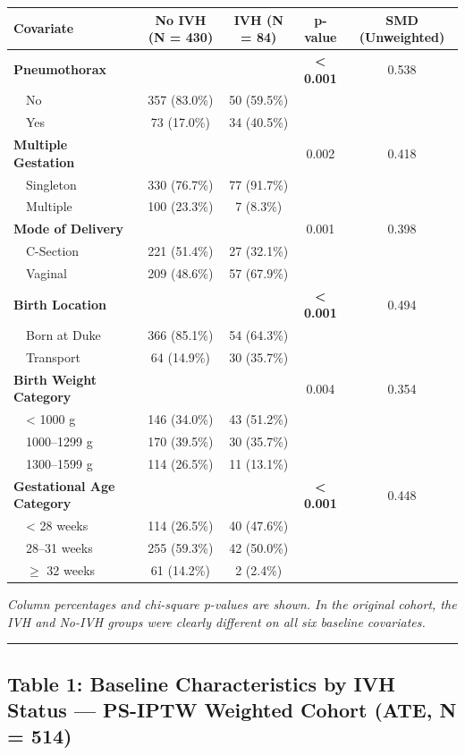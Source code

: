 \documentclass[
]{article}
\begin{document}
\begin{longtable}[]{@{}lcccc@{}}
\toprule
Covariate & No IVH (N = 430) & IVH (N = 84) & p-value & SMD
(Unweighted) \\
\midrule
\endhead
\textbf{Pneumothorax} & & & \textbf{\textless{} 0.001} & 0.538 \\
 No & 357 (83.0\%) & 50 (59.5\%) & & \\
 Yes & 73 (17.0\%) & 34 (40.5\%) & & \\
\textbf{Multiple Gestation} & & & 0.002 & 0.418 \\
 Singleton & 330 (76.7\%) & 77 (91.7\%) & & \\
 Multiple & 100 (23.3\%) & 7 (8.3\%) & & \\
\textbf{Mode of Delivery} & & & 0.001 & 0.398 \\
 C-Section & 221 (51.4\%) & 27 (32.1\%) & & \\
 Vaginal & 209 (48.6\%) & 57 (67.9\%) & & \\
\textbf{Birth Location} & & & \textbf{\textless{} 0.001} & 0.494 \\
 Born at Duke & 366 (85.1\%) & 54 (64.3\%) & & \\
 Transport & 64 (14.9\%) & 30 (35.7\%) & & \\
\textbf{Birth Weight Category} & & & 0.004 & 0.354 \\
 \textless{} 1000 g & 146 (34.0\%) & 43 (51.2\%) & & \\
 1000--1299 g & 170 (39.5\%) & 30 (35.7\%) & & \\
 1300--1599 g & 114 (26.5\%) & 11 (13.1\%) & & \\
\textbf{Gestational Age Category} & & & \textbf{\textless{} 0.001} &
0.448 \\
 \textless{} 28 weeks & 114 (26.5\%) & 40 (47.6\%) & & \\
 28--31 weeks & 255 (59.3\%) & 42 (50.0\%) & & \\
 \(\geq\) 32 weeks & 61 (14.2\%) & 2 (2.4\%) & & \\
\bottomrule
\end{longtable}

\emph{Column percentages and chi-square p-values are shown. In the
original cohort, the IVH and No-IVH groups were clearly different on all
six baseline covariates.}

\begin{center}\rule{0.5\linewidth}{0.5pt}\end{center}

\hypertarget{table-1-baseline-characteristics-by-ivh-status-ps-iptw-weighted-cohort-ate-n-514}{%
\subsection{Table 1: Baseline Characteristics by IVH Status --- PS-IPTW
Weighted Cohort (ATE, N =
514)}\label{table-1-baseline-characteristics-by-ivh-status-ps-iptw-weighted-cohort-ate-n-514}}
\end{document}
